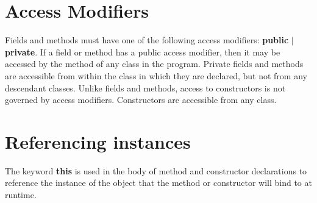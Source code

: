 \begin{homeworkProblem}
	\section{Access Modifiers}
    Fields and methods must have one of the following access modifiers: \textbf{public} $|$ \textbf{private}. If a field or method has a public access modifier, then it may be accessed by the method of any class in the program. Private fields and methods are accessible from within the class in which they are declared, but not from any descendant classes.
    \newline
    Unlike fields and methods, access to constructors is not governed by access modifiers. Constructors are accessible from any class.
	
	
	\section{Referencing instances}
	The keyword \textbf{this} is used in the body of method and constructor declarations to reference the instance of the object that the method or constructor will bind to at runtime.

\end{homeworkProblem}
